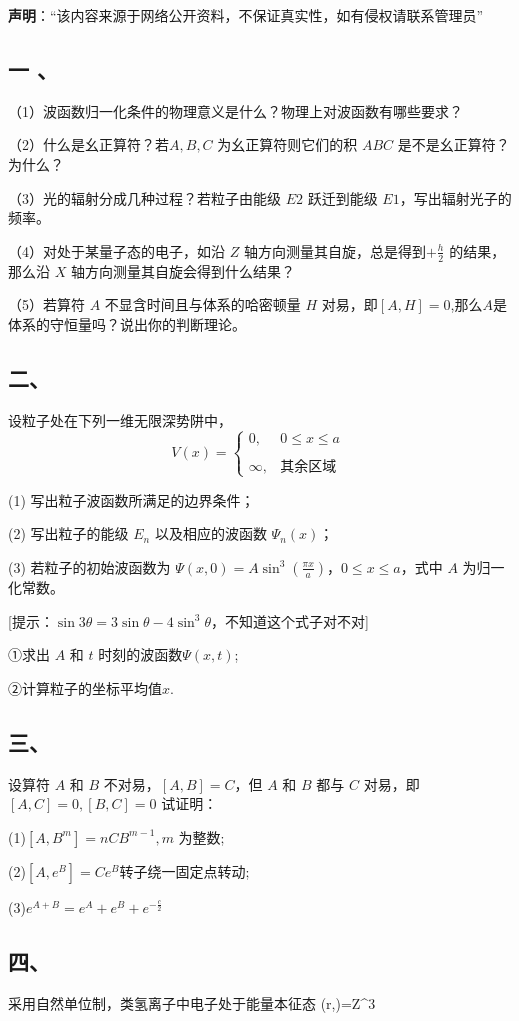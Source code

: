 
\textbf{声明}：“该内容来源于网络公开资料，不保证真实性，如有侵权请联系管理员”

\subsection{一 、}

（1）波函数归一化条件的物理意义是什么？物理上对波函数有哪些要求？

（2）什么是幺正算符？若$ A,B,C$ 为幺正算符则它们的积 $ABC$ 是不是幺正算符？为什么？

（3）光的辐射分成几种过程？若粒子由能级 $E2$ 跃迁到能级 $E1$，写出辐射光子的频率。

（4）对处于某量子态的电子，如沿 $Z$ 轴方向测量其自旋，总是得到$+\frac{h}{2}$
 的结果，那么沿 $X$ 轴方向测量其自旋会得到什么结果？

（5）若算符 $A$ 不显含时间且与体系的哈密顿量 $H$ 对易，即$[A,H]=0$,那么$A$是体系的守恒量吗？说出你的判断理论。
\subsection{二、}
设粒子处在下列一维无限深势阱中，
\[V(x) = \begin{cases} 0, & 0 \leq x \leq a \\\\\infty, & \text{其余区域}\end{cases}~\]

(1) 写出粒子波函数所满足的边界条件；

(2) 写出粒子的能级 $E_n$ 以及相应的波函数 $\Psi_n(x)$；

(3) 若粒子的初始波函数为 $\Psi(x,0) = A\sin^3 \left(\frac{\pi x}{a}\right)$，$0 \leq x \leq a$，式中 $A$ 为归一化常数。

[提示：$\sin 3\theta = 3 \sin \theta - 4 \sin^3 \theta$，不知道这个式子对不对]

①求出 $A$ 和 $t$ 时刻的波函数$\Psi(x,t)$;

②计算粒子的坐标平均值$x$.
\subsection{三、}
设算符 $A$ 和 $B$ 不对易，$[A,B]=C$，但 $A$ 和 $B$ 都与 $C$ 对易，即
$[A,C]=0,[B,C]=0$ 试证明：

(1)$[A, B^m] =n CB^{m-1} ,m$ 为整数;

(2)$[A, e^B] =Ce^B$转子绕一固定点转动;

(3)$e^{A+B} =e^A+e^B+e^{-\frac{c}{2}}$ 
\subsection{四、}

采用自然单位制，类氢离子中电子处于能量本征态
$$\psi(r,\theta)=Z^3
